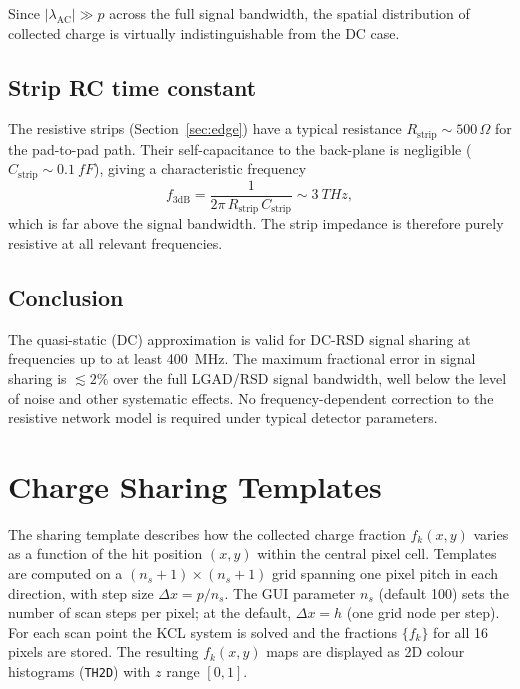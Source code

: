 \documentclass[preprint,numbers,1p]{elsarticle}
\begin{document}
Since $|\lambda_\mathrm{AC}| \gg p$ across the full signal bandwidth, the spatial
distribution of collected charge is virtually indistinguishable from the DC case.

\subsection{Strip RC time constant}
\label{sec:strip_rc}

The resistive strips (Section~\ref{sec:edge}) have a typical resistance
$R_\mathrm{strip} \sim 500\,\Omega$ for the pad-to-pad path. Their self-capacitance
to the back-plane is negligible ($C_\mathrm{strip} \sim \SI{0.1}{fF}$), giving a
characteristic frequency
\begin{equation}
  f_\mathrm{3dB} = \frac{1}{2\pi\,R_\mathrm{strip}\,C_\mathrm{strip}} \sim \SI{3}{THz},
\end{equation}
which is far above the signal bandwidth. The strip impedance is therefore purely
resistive at all relevant frequencies.

\subsection{Conclusion}
\label{sec:quasistatic_conclusion}

The quasi-static (DC) approximation is valid for DC-RSD signal sharing at frequencies
up to at least \SI{400}{MHz}. The maximum fractional error in signal sharing is
$\lesssim 2\%$ over the full LGAD/RSD signal bandwidth, well below the level of
noise and other systematic effects. No frequency-dependent correction to the
resistive network model is required under typical detector parameters.

\section{Charge Sharing Templates}
\label{sec:templates}

The sharing template describes how the collected charge fraction $f_k(x,y)$ varies as a
function of the hit position $(x,y)$ within the central pixel cell. Templates are computed on
a $(n_s+1)\times(n_s+1)$ grid spanning one pixel pitch in each direction, with step size
$\Delta x = p/n_s$. The GUI parameter $n_s$ (default 100) sets the number of scan steps per
pixel; at the default, $\Delta x = h$ (one grid node per step). For each scan point the KCL
system is solved and the fractions $\{f_k\}$ for all 16 pixels are stored. The resulting
$f_k(x,y)$ maps are displayed as 2D colour histograms (\texttt{TH2D}) with $z$ range $[0,1]$.
\end{document}
